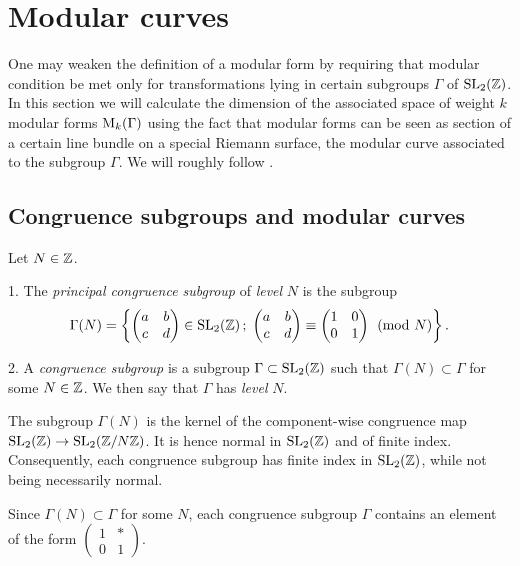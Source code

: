 \section{Modular curves}

\newcommand{\jrm}{\mathrm{j}}

One may weaken the definition of a modular form by requiring that modular condition be met only for transformations lying in certain subgroups $\Gamma$ of $\operatorname{SL}_2(\mathbb{Z})$. In this section we will calculate the dimension of the associated space of weight $k$ modular forms $\mathrm{M}_k(\Gamma)$ using the fact that modular forms can be seen as section of a certain line bundle on a special Riemann surface, the modular curve associated to the subgroup $\Gamma$. We will roughly follow \cite[Ch. 1-3]{diamond2006}.

\subsection{Congruence subgroups and modular curves}

\begin{defi}
 Let $N\in \mathbb{Z}$.
 
 1. The \emph{principal congruence subgroup} of \emph{level} $N$ is the subgroup
 \[\Gamma(N)=\left\{\begin{pmatrix} a & b \\ c & d \end{pmatrix}\in\operatorname{SL}_2(\mathbb{Z})\,;\; \begin{pmatrix}a & b \\ c & d\end{pmatrix} \equiv \begin{pmatrix}1 & 0 \\ 0 & 1\end{pmatrix} \pmod{N}\right\}.\]
 
 2. A \emph{congruence subgroup} is a subgroup $\Gamma\subset\operatorname{SL}_2(\mathbb{Z})$ such that $\Gamma(N)\subset\Gamma$ for some $N\in\mathbb{Z}$. We then say that $\Gamma$ has \emph{level} $N$. 
\end{defi}

\begin{rmk}
 The subgroup $\Gamma(N)$ is the kernel of the component-wise congruence map $\operatorname{SL}_2(\mathbb{Z})\to\operatorname{SL}_2(\mathbb{Z}/N\mathbb{Z})$. It is hence normal in $\operatorname{SL}_2(\mathbb{Z})$ and of finite index. Consequently, each congruence subgroup has finite index in $\operatorname{SL}_2(\mathbb{Z})$, while not being necessarily normal.
\end{rmk}

\begin{rmk} \label{pr:smallest-h}
 Since $\Gamma(N)\subset\Gamma$ for some $N$, each congruence subgroup $\Gamma$ contains an element of the form $\left(\begin{smallmatrix}1 & *\\0 & 1\end{smallmatrix}\right)$.
\end{rmk}

